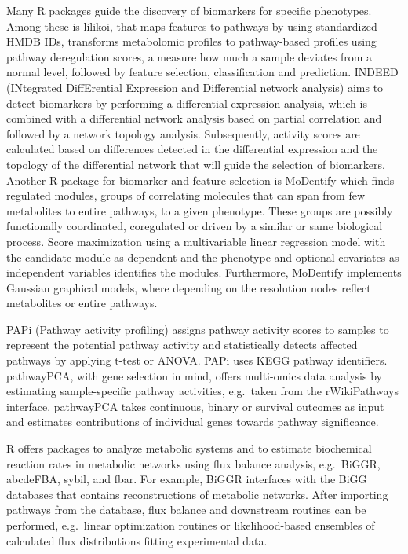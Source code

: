 \documentclass[]{article}
\begin{document}
Many R packages guide the discovery of biomarkers for specific phenotypes. Among these is lilikoi, that maps features to pathways by using standardized HMDB IDs, transforms metabolomic profiles to pathway-based profiles using pathway deregulation scores, a measure how much a sample deviates from a normal level, followed by feature selection, classification and prediction. INDEED (INtegrated DiffErential Expression and Differential network analysis) aims to detect biomarkers by performing a differential expression analysis, which is combined with a differential network analysis based on partial correlation and followed by a network topology analysis. Subsequently, activity scores are calculated based on differences detected in the differential expression and the topology of the differential network that will guide the selection of biomarkers. Another R package for biomarker and feature selection is MoDentify which finds regulated modules, groups of correlating molecules that can span from few metabolites to entire pathways, to a given phenotype. These groups are possibly functionally coordinated, coregulated or driven by a similar or same biological process. Score maximization using a multivariable linear regression model with the candidate module as dependent and the phenotype and optional covariates as independent variables identifies the modules. Furthermore, MoDentify implements Gaussian graphical models, where depending on the resolution nodes reflect metabolites or entire pathways.

PAPi (Pathway activity profiling) assigns pathway activity scores to samples to represent the potential pathway activity and statistically detects affected pathways by applying t-test or ANOVA. PAPi uses KEGG pathway identifiers. pathwayPCA, with gene selection in mind, offers multi-omics data analysis by estimating sample-specific pathway activities, e.g.~taken from the rWikiPathways interface. pathwayPCA takes continuous, binary or survival outcomes as input and estimates contributions of individual genes towards pathway significance.

R offers packages to analyze metabolic systems and to estimate biochemical reaction rates in metabolic networks using flux balance analysis, e.g.~BiGGR, abcdeFBA, sybil, and fbar. For example, BiGGR interfaces with the BiGG databases that contains reconstructions of metabolic networks. After importing pathways from the database, flux balance and downstream routines can be performed, e.g.~linear optimization routines or likelihood-based ensembles of calculated flux distributions fitting experimental data.
\end{document}
